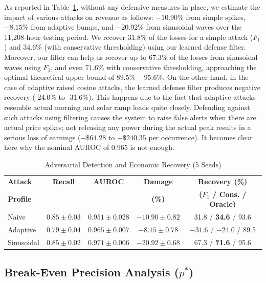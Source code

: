 \documentclass[journal]{IEEEtran}
\begin{document}
As reported in Table~\ref{tab:adv_detect}, without any defensive measures in place, we estimate the impact of various attacks on revenue as follows: $-10.90\%$ from simple spikes, $-8.15\%$ from adaptive bumps, and $-20.92\%$ from sinusoidal waves over the 11,208-hour testing period. We recover $31.8\%$ of the losses for a simple attack ($F_1$) and $34.6\%$ (with conservative thresholding) using our learned defense filter. Moreover, our filter can help us recover up to $67.3\%$ of the losses from sinusoidal waves using $F_1$, and even $71.6\%$ with conservative thresholding, approaching the optimal theoretical upper bound of $89.5\% - 95.6\%$. On the other hand, in the case of adaptive raised cosine attacks, the learned defense filter produces negative recovery (-24.0\% to -31.6\%). This happens due to the fact that adaptive attacks resemble actual morning and solar ramp loads quite closely. Defending against such attacks using filtering causes the system to raise false alerts when there are actual price spikes; not releasing any power during the actual peak results in a serious loss of earnings ($-\$64.28$ to $-\$240.35$ per occurrence). It becomes clear here why the nominal AUROC of $0.965$ is not enough.

\begin{table}[!t]
\centering
\caption{Adversarial Detection and Economic Recovery (5 Seeds)}
\label{tab:adv_detect}
\scriptsize
\renewcommand{\arraystretch}{1.15}
\setlength{\tabcolsep}{0.6pt}
\begin{tabular*}{\columnwidth}{@{\extracolsep{\fill}}lcccc}
\toprule
\textbf{Attack} & \textbf{Recall} & \textbf{AUROC} & \textbf{Damage} & \textbf{Recovery (\%)} \\
\textbf{Profile} & & & \textbf{(\%)} & \textbf{($F_1$ / Cons. / Oracle)} \\
\midrule
 Naive & $0.85\pm 0.03$ & $0.951\pm 0.028$ & $-10.90\pm 0.82$ & 31.8 / \textbf{34.6} / 93.6 \\
 Adaptive & $0.79\pm 0.04$ & $0.965\pm 0.007$ & $-8.15\pm 0.78$ & $-31.6$ / $-24.0$ / 89.5 \\
 Sinusoidal & $0.85\pm 0.02$ & $0.971\pm 0.006$ & $-20.92\pm 0.68$ & 67.3 / \textbf{71.6} / 95.6 \\
\bottomrule
\end{tabular*}
\end{table}

\subsection{Break-Even Precision Analysis \texorpdfstring{($p^*$)}{(p*)}}
\end{document}

